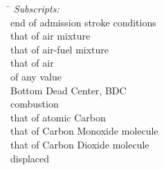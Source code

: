 \begin{tabbing}\hspace*{\lensymb}\=\hspace*{\lenWHAT}\kill
    {\em Subscripts:} \\
                                      \> end of admission stroke conditions                                                                                                       \\
              \> that of air mixture                                                                                                                      \\
             \> that of air-fuel mixture                                                                                                                 \\
               \> that of air                                                                                                                              \\
                                  \> of any value                                                                                                                             \\
    \tcs{{}_{\bdc}}                             \> Bottom Dead Center, BDC                                                                                                                  \\
                                      \> combustion                                                                                                                               \\
            \> that of atomic Carbon                                                                                                                    \\
           \> that of Carbon Monoxide molecule                                                                                                         \\
          \> that of Carbon Dioxide molecule                                                                                                          \\
                                      \> displaced                                                                                                                                \\

\end{tabbing}
